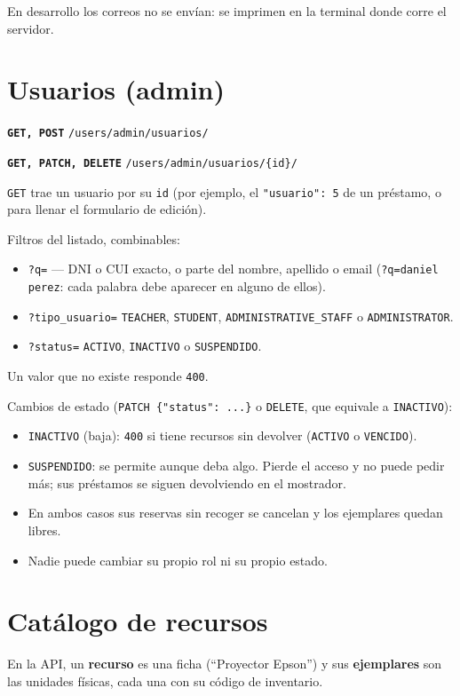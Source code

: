 \documentclass[11pt]{article}
\newcommand{\us}{\_\allowbreak}
\newcommand{\metodo}[2]{\textbf{\texttt{#1}} \texttt{#2}}
\begin{document}
En desarrollo los correos no se env\'ian: se imprimen en la terminal donde corre el servidor.

\section{Usuarios (admin)}

\metodo{GET, POST}{/users/admin/usuarios/}

\metodo{GET, PATCH, DELETE}{/users/admin/usuarios/\{id\}/}

\texttt{GET} trae un usuario por su \texttt{id} (por ejemplo, el \texttt{"usuario": 5} de un pr\'estamo, o para llenar el formulario de edici\'on).

Filtros del listado, combinables:
\begin{itemize}
    \item \texttt{?q=} --- DNI o CUI exacto, o parte del nombre, apellido o email (\texttt{?q=daniel perez}: cada palabra debe aparecer en alguno de ellos).
    \item \texttt{?tipo\us usuario=} \texttt{TEACHER}, \texttt{STUDENT}, \texttt{ADMINISTRATIVE\us STAFF} o \texttt{ADMINISTRATOR}.
    \item \texttt{?status=} \texttt{ACTIVO}, \texttt{INACTIVO} o \texttt{SUSPENDIDO}.
\end{itemize}
Un valor que no existe responde \texttt{400}.

Cambios de estado (\texttt{PATCH \{"status": ...\}} o \texttt{DELETE}, que equivale a \texttt{INACTIVO}):
\begin{itemize}
    \item \texttt{INACTIVO} (baja): \texttt{400} si tiene recursos sin devolver (\texttt{ACTIVO} o \texttt{VENCIDO}).
    \item \texttt{SUSPENDIDO}: se permite aunque deba algo. Pierde el acceso y no puede pedir m\'as; sus pr\'estamos se siguen devolviendo en el mostrador.
    \item En ambos casos sus reservas sin recoger se cancelan y los ejemplares quedan libres.
    \item Nadie puede cambiar su propio rol ni su propio estado.
\end{itemize}

\section{Cat\'alogo de recursos}

En la API, un \textbf{recurso} es una ficha (\textquotedblleft Proyector Epson\textquotedblright) y sus \textbf{ejemplares} son las unidades f\'isicas, cada una con su c\'odigo de inventario.
\end{document}
